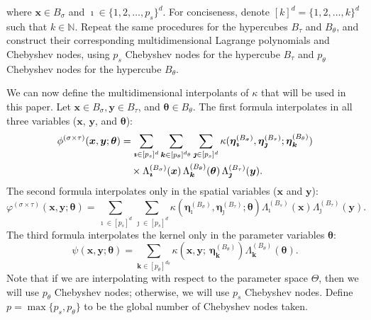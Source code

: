 \documentclass[final,3p,times]{elsarticle}
\renewcommand{\vec}[1]{\boldsymbol{#1}}
\begin{document}
where $\vec{x} \in B_{\sigma}$ and $\vec{\imath} \in \{1, 2, \dots, p_{s}\}^{d}$. For conciseness, denote $[k]^{d} = \{1, 2, \dots, k\}^{d}$ such that $k \in \mathbb{N}$.
Repeat the same procedures for the hypercubes $B_{\tau}$ and $B_{\theta}$, and construct their corresponding multidimensional Lagrange polynomials and Chebyshev nodes, using $p_{s}$ Chebyshev nodes for the hypercube $B_{\tau}$ and $p_{\theta}$ Chebyshev nodes for the hypercube $B_{\theta}$.  


We can now define the multidimensional interpolants of $\kappa$ that will be used in this paper. Let $\vec{x} \in B_{\sigma}, \vec{y} \in B_{\tau}$, and $\vec{\theta} \in B_{\theta}$. The first formula interpolates in all three variables ($\vec{x}$, $\vec{y}$, and $\vec{\theta}$):
\begin{align}\label{eqn:int_of_kappa_1}
\phi^{(\sigma \times \tau)}(\vec{x}, \vec{y}; \vec{\theta})
   &= \sum_{\vec{\imath} \in [p_s]^{d}}
      \sum_{\vec{k} \in [p_\theta]^{d_\theta}}
      \sum_{\vec{\jmath} \in [p_s]^d}
      \kappa(\vec{\eta}^{(B_{\sigma})}_{\vec{\imath}}, 
             \vec{\eta}^{(B_{\tau})}_{\vec{\jmath}}; 
             \vec{\eta}_{\vec{k}}^{(B_{\theta})}) \notag \\
   &\quad\times 
      \Lambda_{\vec{\imath}}^{(B_{\sigma})}(\vec{x})\,
      \Lambda^{(B_{\theta})}_{\vec{k}}(\vec{\theta})\,
      \Lambda_{\vec{\jmath}}^{(B_{\tau})}(\vec{y}).
\end{align}
The second formula interpolates only in the spatial variables ($\vec{x}$ and $\vec{y}$):
\begin{equation}\label{eqn:int_of_kappa_2}
\varphi^{(\sigma \times \tau)}(\vec{x}, \vec{y}; \vec{\theta}) = \sum_{\vec{\imath} \in [p_s]^{d}}\sum_{\vec{\jmath} \in [p_s]^d} \kappa(\vec{\eta}^{(B_{\sigma})}_{\vec{\imath}}, \vec{\eta}^{(B_{\tau})}_{\vec{\jmath}}; \vec{\theta})  \Lambda_{\vec{\imath}}^{(B_s)}(\vec{x}) \Lambda_{\vec{\jmath}}^{(B_{\tau})}(\vec{y}).
\end{equation}
The third formula interpolates the kernel only in the parameter variables $\vec\theta$:
\begin{equation}\label{eqn:int_of_kappa_3}
\psi(\vec{x}, \vec{y}; \vec{\theta}) = \sum_{\vec{k} \in [p_\theta]^{d_\theta}} \kappa(\vec{x}, \vec{y}; ~\vec{\eta}_{\vec{k}}^{(B_{\theta})}) \Lambda^{(B_{\theta})}_{\vec{k}}(\vec{\theta}).
\end{equation}
Note that if we are interpolating with respect to the parameter space $\Theta$, then we will use $p_{\theta}$ Chebyshev nodes; otherwise, we will use $p_{s}$ Chebyshev nodes. Define $p = \max \{ p_{s}, p_{\theta}\}$ to be the global number of Chebyshev nodes taken. 
\end{document}
